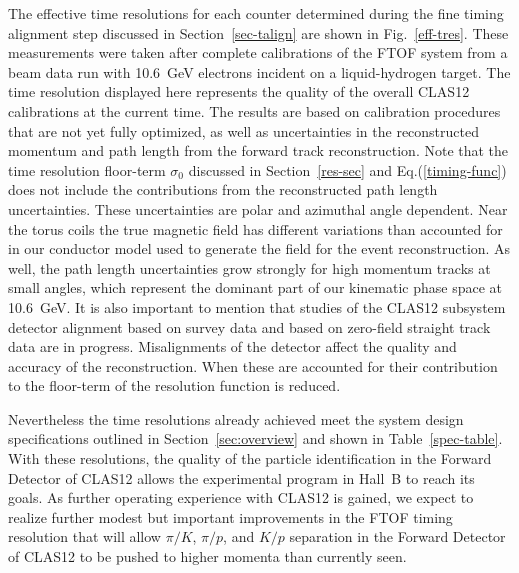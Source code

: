 \documentclass{elsart}
\begin{document}
The effective time resolutions for each counter determined during the fine timing alignment step
discussed in Section~\ref{sec-talign} are shown in Fig.~\ref{eff-tres}. These measurements were
taken after complete calibrations of the FTOF system from a beam data run with 10.6~GeV electrons
incident on a liquid-hydrogen target. The time resolution displayed here represents the quality of the
overall CLAS12 calibrations at the current time. The results are based on calibration procedures that
are not yet fully optimized, as well as uncertainties in the reconstructed momentum and path length
from the forward track reconstruction. Note that the time resolution floor-term $\sigma_0$ discussed
in Section~\ref{res-sec} and Eq.(\ref{timing-func}) does not include the contributions from the
reconstructed path length uncertainties. These uncertainties are polar and azimuthal angle dependent.
Near the torus coils the true magnetic field has different variations than accounted for in our conductor
model used to generate the field for the event reconstruction. As well, the path length uncertainties grow
strongly for high momentum tracks at small angles, which represent the dominant part of our kinematic
phase space at 10.6~GeV. It is also important to mention that studies of the CLAS12 subsystem detector
alignment based on survey data and based on zero-field straight track data are in progress. Misalignments of
the detector affect the quality and accuracy of the reconstruction. When these are accounted for their
contribution to the floor-term of the resolution function is reduced.

Nevertheless the time resolutions already achieved meet the system design specifications outlined in
Section~\ref{sec:overview} and shown in Table~\ref{spec-table}. With these resolutions, the quality of the
particle identification in the Forward Detector of CLAS12 allows the experimental program in Hall~B to reach
its goals. As further operating experience with CLAS12 is gained, we expect to realize further modest but
important improvements in the FTOF timing resolution that will allow $\pi/K$, $\pi/p$, and $K/p$ separation
in the Forward Detector of CLAS12 to be pushed to higher momenta than currently seen.
\end{document}

